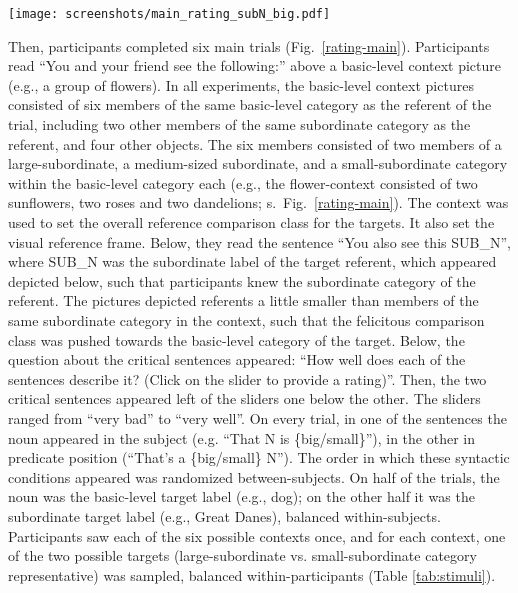 \begin{figure*}[t]
	\begin{center}
		\texttt{[image: screenshots/main\_rating\_subN\_big.pdf]}
	\end{center}
	\vspace{-0.5cm}
	\caption{Example view of a sentence rating main trial: The critical noun is a subordinate target label of a large-subordinate category, appearing in the subject or predicate of the sentence.}
	\label{rating-main}
\end{figure*}
Then, participants completed six main trials (Fig.~\ref{rating-main}). Participants read “You and your friend see the following:” above a basic-level context picture (e.g., a group of flowers). In all experiments, the basic-level context pictures consisted of six members of the same basic-level category as the referent of the trial, including two other members of the same subordinate category as the referent, and four other objects. The six members consisted of two members of a large-subordinate, a medium-sized subordinate, and a small-subordinate category within the basic-level category each (e.g., the flower-context consisted of two sunflowers, two roses and two dandelions; s.~Fig.~\ref{rating-main}). The context was used to set the overall reference comparison class for the targets. It also set the visual reference frame.
Below, they read the sentence “You also see this SUB\_N”, where SUB\_N was the subordinate label of the target referent, which appeared depicted below, such that participants knew the subordinate category of the referent. The pictures depicted referents a little smaller than members of the same subordinate category in the context, such that the felicitous comparison class was pushed towards the basic-level category of the target.
Below, the question about the critical sentences appeared: “How well does each of the sentences describe it? (Click on the slider to provide a rating)”. Then, the two critical sentences appeared left of the sliders one below the other. The sliders ranged from “very bad” to “very well”. On every trial, in one of the sentences the noun appeared in the subject (e.g. “That N is \{big/small\}”), in the other in predicate position (“That’s a \{big/small\} N”). The order in which these syntactic conditions appeared was randomized between-subjects. 
On half of the trials, the noun was the basic-level target label (e.g., dog); on the other half it was the subordinate target label (e.g., Great Danes), balanced within-subjects. 
Participants saw each of the six possible contexts once, and for each context, one of the two possible targets (large-subordinate vs. small-subordinate category representative) was sampled, balanced within-participants (Table \ref{tab:stimuli}). 

